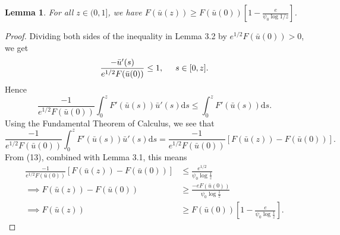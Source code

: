 \documentclass{article}
\newtheorem{lem}[thm]{Lemma}
\begin{document}
    \begin{lem}
        For all $z\in(0,1]$, we have $F(\bar u(z))\geq F(\bar u(0))\left[1 - \frac e{\psi_0\log 1/z}\right]$.
    \end{lem}
    \begin{proof}
        Dividing both sides of the inequality in Lemma 3.2 by $e^{1/2}F(\bar u(0))>0$, we get
        \begin{align*}
            \frac{-\bar u'(s)}{e^{1/2}F(\bar u(0))}\leq 1,\hspace{.5cm} s\in[0,z].
        \end{align*}
        Hence
        \begin{equation}
            \frac {-1}{e^{1/2}F(\bar u(0))}\int_0^zF'(\bar u(s))\bar u'(s)\mathrm{d}s \leq \int_0^z F'(\bar u(s))\mathrm{d}s.
        \end{equation}
        Using the Fundamental Theorem of Calculus, we see that
        \[\frac {-1}{e^{1/2}F(\bar u(0))}\int_0^zF'(\bar u(s))\bar u'(s)\mathrm{d}s =  \frac{-1}{e^{1/2}F(\bar u(0))}[F(\bar u(z))-F(\bar u(0))].\]
        From (13), combined with Lemma 3.1, this means
        \begin{align*}
            \frac{-1}{e^{1/2}F(\bar u(0))}[F(\bar u(z))-F(\bar u(0))] &\leq \frac{e^{1/2}}{\psi_0\log\frac 1z} \\
            \implies
            F(\bar u(z)) - F(\bar u(0)) &\geq \frac{-eF(\bar u(0))}{\psi_0\log\frac 1z} \\
            \implies F(\bar u(z)) &\geq F(\bar u(0))\left[1 - \frac e{\psi_0\log \frac 1z}\right].
        \end{align*}
    \end{proof}
\end{document}
